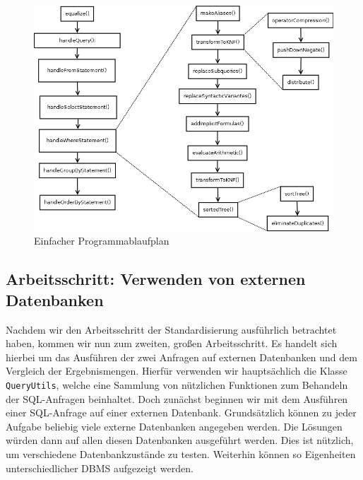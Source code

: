 \begin{figure}[h]
\centering
\includegraphics[scale=0.39]{Bilder/execPlan.png}
\caption{Einfacher Programmablaufplan}
\label{fig:execPlan}
\end{figure}

\subsection*{Arbeitsschritt: Verwenden von externen Datenbanken} 

Nachdem wir den Arbeitsschritt der Standardisierung ausführlich betrachtet haben, kommen wir nun zum zweiten, großen Arbeitsschritt. Es handelt sich hierbei um das Ausführen der zwei Anfragen auf externen Datenbanken und dem Vergleich der Ergebnismengen. Hierfür verwenden wir hauptsächlich die Klasse \verb|QueryUtils|, welche eine Sammlung von nützlichen Funktionen zum Behandeln der SQL-Anfragen beinhaltet. Doch zunächst beginnen wir mit dem Ausführen einer SQL-Anfrage auf einer externen Datenbank. Grundsätzlich können zu jeder Aufgabe beliebig viele externe Datenbanken angegeben werden. Die Lösungen würden dann auf allen diesen Datenbanken ausgeführt werden. Dies ist nützlich, um verschiedene Datenbankzustände zu testen. Weiterhin können so Eigenheiten unterschiedlicher DBMS aufgezeigt werden. 

